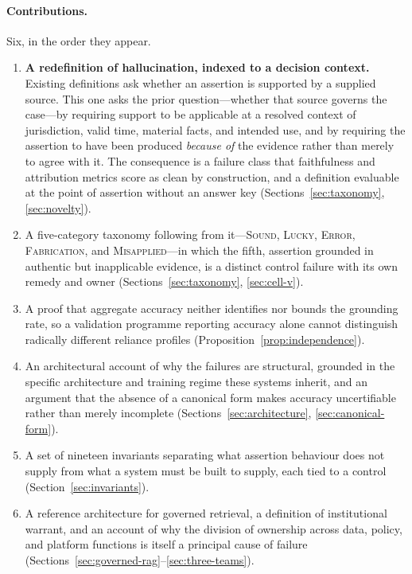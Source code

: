 \paragraph{Contributions.} Six, in the order they appear.

\begin{enumerate}
  \item \textbf{A redefinition of hallucination, indexed to a decision context.}
        Existing definitions ask whether an assertion is supported by a supplied
        source. This one asks the prior question---whether that source governs the
        case---by requiring support to be applicable at a resolved context of
        jurisdiction, valid time, material facts, and intended use, and by
        requiring the assertion to have been produced \emph{because of} the evidence
        rather than merely to agree with it. The consequence is a failure class that
        faithfulness and attribution metrics score as clean by construction, and a
        definition evaluable at the point of assertion without an answer key
        (Sections~\ref{sec:taxonomy}, \ref{sec:novelty}).
  \item A five-category taxonomy following from it---\textsc{Sound},
        \textsc{Lucky}, \textsc{Error}, \textsc{Fabrication}, and
        \textsc{Misapplied}---in which the fifth, assertion grounded in authentic
        but inapplicable evidence, is a distinct control failure with its own
        remedy and owner (Sections~\ref{sec:taxonomy}, \ref{sec:cell-v}).
  \item A proof that aggregate accuracy neither identifies nor bounds the grounding
        rate, so a validation programme reporting accuracy alone cannot distinguish
        radically different reliance profiles
        (Proposition~\ref{prop:independence}).
  \item An architectural account of why the failures are structural, grounded in the
        specific architecture and training regime these systems inherit, and an
        argument that the absence of a canonical form makes accuracy uncertifiable
        rather than merely incomplete
        (Sections~\ref{sec:architecture}, \ref{sec:canonical-form}).
  \item A set of nineteen invariants separating what assertion behaviour does not
        supply from what a system must be built to supply, each tied to a control
        (Section~\ref{sec:invariants}).
  \item A reference architecture for governed retrieval, a definition of
        institutional warrant, and an account of why the division of ownership
        across data, policy, and platform functions is itself a principal cause of
        failure (Sections~\ref{sec:governed-rag}--\ref{sec:three-teams}).
\end{enumerate}

